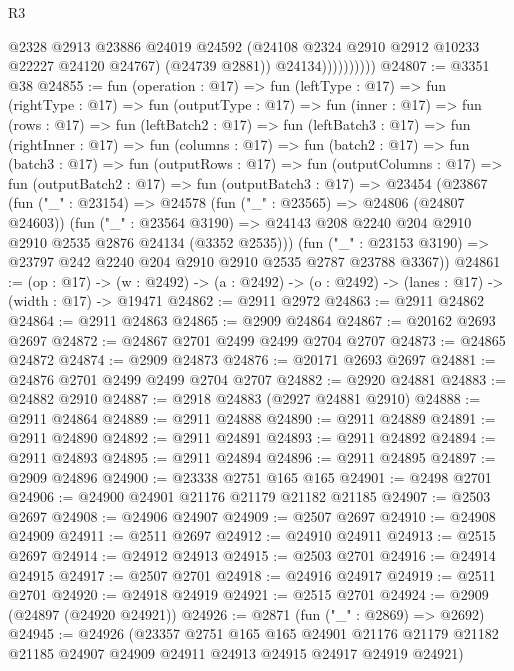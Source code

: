 \begin{lexlean}{R3}
\begin{coremodule}
                          @2328
                          @2913
                          @23886
                          @24019
                          @24592
                          (@24108 @2324 @2910 @2912 @10233 @22227 @24120 @24767)
                          (@24739 @2881))
                        @24134))))))))))
@24807 := @3351 @38
@24855 := fun (operation : @17) =>
  fun (leftType : @17) =>
  fun (rightType : @17) =>
  fun (outputType : @17) =>
  fun (inner : @17) =>
  fun (rows : @17) =>
  fun (leftBatch2 : @17) =>
  fun (leftBatch3 : @17) =>
  fun (rightInner : @17) =>
  fun (columns : @17) =>
  fun (batch2 : @17) =>
  fun (batch3 : @17) =>
  fun (outputRows : @17) =>
  fun (outputColumns : @17) =>
  fun (outputBatch2 : @17) =>
  fun (outputBatch3 : @17) =>
  @23454
    (@23867
      (fun ("_" : @23154) =>
      @24578
        (fun ("_" : @23565) => @24806 (@24807 @24603))
        (fun ("_" : @23564 @3190) =>
        @24143 @208 @2240 @204 @2910 @2910 @2535 @2876 @24134 (@3352 @2535)))
      (fun ("_" : @23153 @3190) => @23797 @242 @2240 @204 @2910 @2910 @2535 @2787 @23788 @3367))
@24861 := (op : @17) ->
  (w : @2492) -> (a : @2492) -> (o : @2492) -> (lanes : @17) -> (width : @17) -> @19471
@24862 := @2911 @2972
@24863 := @2911 @24862
@24864 := @2911 @24863
@24865 := @2909 @24864
@24867 := @20162 @2693 @2697
@24872 := @24867 @2701 @2499 @2499 @2704 @2707
@24873 := @24865 @24872
@24874 := @2909 @24873
@24876 := @20171 @2693 @2697
@24881 := @24876 @2701 @2499 @2499 @2704 @2707
@24882 := @2920 @24881
@24883 := @24882 @2910
@24887 := @2918 @24883 (@2927 @24881 @2910)
@24888 := @2911 @24864
@24889 := @2911 @24888
@24890 := @2911 @24889
@24891 := @2911 @24890
@24892 := @2911 @24891
@24893 := @2911 @24892
@24894 := @2911 @24893
@24895 := @2911 @24894
@24896 := @2911 @24895
@24897 := @2909 @24896
@24900 := @23338 @2751 @165 @165
@24901 := @2498 @2701
@24906 := @24900 @24901 @21176 @21179 @21182 @21185
@24907 := @2503 @2697
@24908 := @24906 @24907
@24909 := @2507 @2697
@24910 := @24908 @24909
@24911 := @2511 @2697
@24912 := @24910 @24911
@24913 := @2515 @2697
@24914 := @24912 @24913
@24915 := @2503 @2701
@24916 := @24914 @24915
@24917 := @2507 @2701
@24918 := @24916 @24917
@24919 := @2511 @2701
@24920 := @24918 @24919
@24921 := @2515 @2701
@24924 := @2909 (@24897 (@24920 @24921))
@24926 := @2871 (fun ("_" : @2869) => @2692)
@24945 := @24926
    (@23357
      @2751
      @165
      @165
      @24901
      @21176
      @21179
      @21182
      @21185
      @24907
      @24909
      @24911
      @24913
      @24915
      @24917
      @24919
      @24921)

\end{coremodule}
\end{lexlean}
